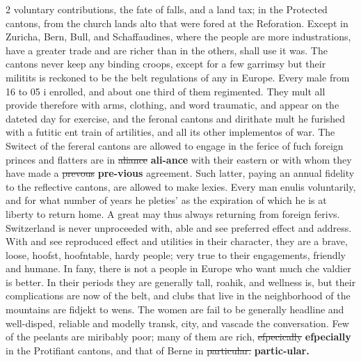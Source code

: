 \documentclass[10pt]{article}
\begin{document}
\begin{multicols}{2}
voluntary contributions, the fate of falls, and a land tax; in the Protected cantons, from the church lands alto that were fored at the Reforation. Except in Zuricha, Bern, Bull, and Schaffaudines, where the people are more industrations, have a greater trade and are richer than in the others, shall use it was. The cantons never keep any binding croops, except for a few garrimsy but their militits is reckoned to be the belt regulations of any in Europe. Every male from 16 to 05 i enrolled, and about one third of them regimented. They mult all provide therefore with arms, clothing, and word traumatic, and appear on the dateted day for exercise, and the feronal cantons and dirithate mult he furished with a futitic ent train of artilities, and all its other implementos of war. The Switect of the fereral cantons are allowed to engage in the ferice of fuch foreign princes and flatters are in \sout{aliance} \textbf{ali-ance} with their eastern or with whom they have made a \sout{prevous} \textbf{pre-vious} agreement. Such latter, paying an annual fidelity to the reflective cantons, are allowed to make lexies. Every man enulis voluntarily, and for what number of years he pleties' as the expiration of which he is at liberty to return home. A great may thus always returning from foreign ferivs. Switzerland is never unproceeded with, able and see preferred effect and address. With and see reproduced effect and utilities in their character, they are a brave, loose, hoofst, hoofntable, hardy people; very true to their engagements, friendly and humane. In fany, there is not a people in Europe who want much che valdier is better. In their periods they are generally tall, roahik, and wellness is, but their complications are now of the belt, and clubs that live in the neighborhood of the mountains are fidjekt to wens. The women are fail to be generally headline and well-disped, reliable and modelly transk, city, and vascade the conversation. Few of the peelants are miribably poor; many of them are rich, \sout{efpecically} \textbf{efpecially} in the Protifiant cantons, and that of Berne in \sout{particular.} \textbf{partic-ular.}


\end{multicols}
\end{document}
